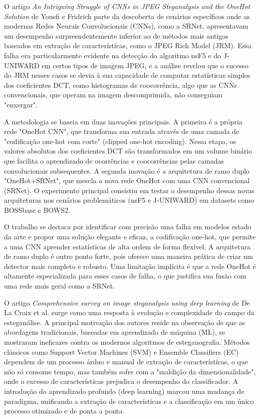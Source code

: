 \documentclass[12pt]{article}
\begin{document}

O artigo \textit{An Intriguing Struggle of CNNs in JPEG Steganalysis and the
  OneHot Solution} de Yousfi e Fridrich \cite{fridrichOnehot} parte da descoberta
de cenários específicos onde as modernas Redes Neurais Convolucionais (CNNs),
como a SRNet, apresentavam um desempenho surpreendentemente inferior ao de
métodos mais antigos baseados em extração de características, como o JPEG Rich
Model (JRM). Essa falha era particularmente evidente na detecção do algoritmo
nsF5 e do J-UNIWARD em certos tipos de imagem JPEG, e a análise revelou que o
sucesso do JRM nesses casos se devia à sua capacidade de computar estatísticas
simples dos coeficientes DCT, como histogramas de coocorrência, algo que as
CNNs convencionais, que operam na imagem descomprimida, não conseguiam
"enxergar".

A metodologia se baseia em duas inovações principais. A primeira é a própria
rede "OneHot CNN", que transforma sua entrada através de uma camada de
"codificação one-hot com corte" (clipped one-hot encoding). Nessa etapa, os
valores absolutos dos coeficientes DCT são transformados em um volume binário
que facilita o aprendizado de ocorrências e coocorrências pelas camadas
convolucionais subsequentes. A segunda inovação é a arquitetura de ramo duplo
"OneHot+SRNet", que mescla a nova rede OneHot com uma CNN convencional (SRNet).
O experimento principal consistiu em testar o desempenho dessas novas
arquiteturas nos cenários problemáticos (nsF5 e J-UNIWARD) em datasets como
BOSSbase e BOWS2.

O trabalho se destaca por identificar com precisão uma falha em modelos estado
da arte e propor uma solução elegante e eficaz, a codificação one-hot, que
permite a uma CNN aprender estatísticas de alta ordem de forma flexível. A
arquitetura de ramo duplo é outro ponto forte, pois oferece uma maneira prática
de criar um detector mais completo e robusto. Uma limitação implícita é que a
rede OneHot é altamente especializada para esses casos de falha, o que
justifica sua fusão com uma rede mais geral como a SRNet.


O artigo \textit{Comprehensive survey on image steganalysis using deep
  learning} de De La Croix et al. \cite{LaCroix2024survey} surge como uma
resposta à evolução e complexidade do campo da esteganálise. A principal
motivação dos autores reside na observação de que as abordagens tradicionais,
baseadas em aprendizado de máquina (ML), se mostraram ineficazes contra os
modernos algoritmos de esteganografia. Métodos clássicos como Support Vector
Machines (SVM) e Ensemble Classifiers (EC) dependem de um processo árduo e
manual de extração de características, o que não só consome tempo, mas também
sofre com a "maldição da dimensionalidade", onde o excesso de características
prejudica o desempenho do classificador. A introdução do aprendizado profundo
(deep learning) marcou uma mudança de paradigma, unificando a extração de
características e a classificação em um único processo otimizado e de ponta a
ponta.
\end{document}
